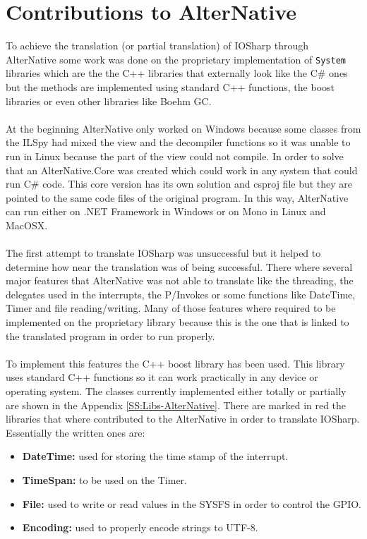 \section{Contributions to AlterNative}\label{AN-WorkDone}
To achieve the translation (or partial translation) of IOSharp through AlterNative some work was done on the proprietary implementation of \verb!System! libraries which are the the C++ libraries that externally look like the C\# ones but the methods are implemented using standard C++ functions, the boost libraries or even other libraries like Boehm GC.
\\
\\
At the beginning AlterNative only worked on Windows because some classes from the ILSpy had mixed the view and the decompiler functions so it was unable to run in Linux because the part of the view could not compile. In order to solve that an AlterNative.Core was created which could work in any system that could run C\# code. This core version has its own solution and csproj file but they are pointed to the same code files of the original program. In this way, AlterNative can run either on .NET Framework in Windows or on Mono in Linux and MacOSX.
\\
\\
The first attempt to translate IOSharp was unsuccessful but it helped to determine how near the translation was of being successful. There where several major features that AlterNative was not able to translate like the threading, the delegates used in the interrupts, the P/Invokes or some functions like DateTime, Timer and file reading/writing. Many of those features where required to be implemented on the proprietary library because this is the one that is linked to the translated program in order to run properly.
\\
\\
To implement this features the C++ boost library has been used. This library uses standard C++ functions so it can work practically in any device or operating system. The classes currently implemented either totally or partially are shown in the Appendix \ref{SS:Libs-AlterNative}. There are marked in red the libraries that where contributed to the AlterNative in order to translate IOSharp. Essentially the written ones are:
\begin{itemize}
\item \textbf{DateTime:} used for storing the time stamp of the interrupt.
\item \textbf{TimeSpan:} to be used on the Timer.
\item \textbf{File:} used to write or read values in the SYSFS in order to control the GPIO.
\item \textbf{Encoding:} used to properly encode strings to UTF-8.
\end{itemize}


